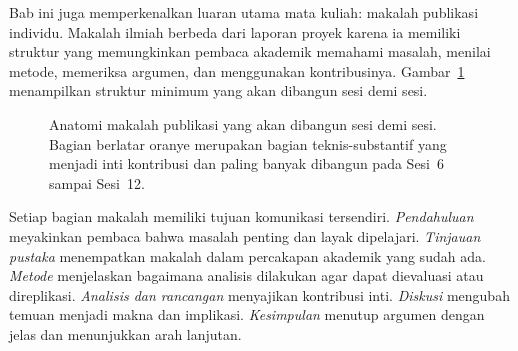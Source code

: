 Bab ini juga memperkenalkan luaran utama mata kuliah: makalah publikasi
individu. Makalah ilmiah berbeda dari laporan proyek karena ia memiliki
struktur yang memungkinkan pembaca akademik memahami masalah, menilai metode,
memeriksa argumen, dan menggunakan kontribusinya. Gambar~\ref{fig:anatomi-makalah}
menampilkan struktur minimum yang akan dibangun sesi demi sesi.

\begin{figure}[htbp]
\centering
{}
\caption{Anatomi makalah publikasi yang akan dibangun sesi demi sesi. Bagian
berlatar oranye merupakan bagian teknis-substantif yang menjadi inti
kontribusi dan paling banyak dibangun pada Sesi~6 sampai Sesi~12.}
\label{fig:anatomi-makalah}
\end{figure}

Setiap bagian makalah memiliki tujuan komunikasi tersendiri.
\emph{Pendahuluan} meyakinkan pembaca bahwa masalah penting dan layak
dipelajari. \emph{Tinjauan pustaka} menempatkan makalah dalam percakapan
akademik yang sudah ada. \emph{Metode} menjelaskan bagaimana analisis
dilakukan agar dapat dievaluasi atau direplikasi. \emph{Analisis dan
rancangan} menyajikan kontribusi inti. \emph{Diskusi} mengubah temuan menjadi
makna dan implikasi. \emph{Kesimpulan} menutup argumen dengan jelas dan
menunjukkan arah lanjutan.

